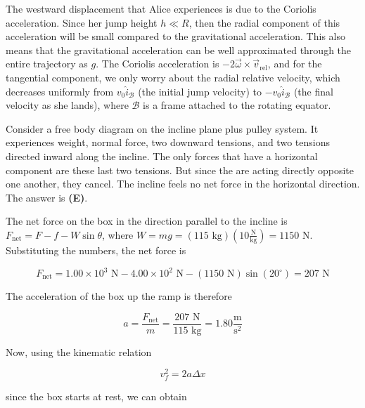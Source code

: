 \documentclass[12pt]{article}
\begin{document}
\vspace{2 \baselineskip}



The westward displacement that Alice experiences is due to the Coriolis acceleration. Since her jump height $h \ll R$, then the radial component of this acceleration will be small compared to the gravitational acceleration. This also means that the gravitational acceleration can be well approximated through the entire trajectory as $g$. The Coriolis acceleration is $-2 \vec{\omega} \times \vec{v}_\text{rel}$, and for the tangential component, we only worry about the radial relative velocity, which decreases uniformly from $v_0 \hat{i}_\mathcal{B}$ (the initial jump velocity) to $-v_0 \hat{i}_\mathcal{B}$ (the final velocity as she lands), where $\mathcal{B}$ is a frame attached to the rotating equator.


\vspace{2 \baselineskip}



Consider a free body diagram on the incline plane plus pulley system. It experiences weight, normal force, two downward tensions, and two tensions directed inward along the incline. The only forces that have a horizontal component are these last two tensions. But since the are acting directly opposite one another, they cancel. The incline feels no net force in the horizontal direction. The answer is \textbf{(E)}.


\vspace{2 \baselineskip}



The net force on the box in the direction parallel to the incline is $F_\text{net} = F - f - W \sin \theta$, where $W = m g = (115 \text{ kg}) \left( 10 \frac{\text{N}}{\text{kg}} \right) = 1150 \text{ N}$. Substituting the numbers, the net force is

$$F_\text{net} = 1.00 \times 10^3 \text{ N} - 4.00 \times 10^2 \text{ N} - (1150 \text{ N}) \sin (20^\circ) = 207 \text{ N}$$

The acceleration of the box up the ramp is therefore

$$a = \frac{F_\text{net}}{m} = \frac{207 \text{ N}}{115 \text{ kg}} = 1.80 \frac{\text{m}}{\text{s}^2}$$

Now, using the kinematic relation

$$v_f^2 = 2 a \Delta x$$

since the box starts at rest, we can obtain
\end{document}

